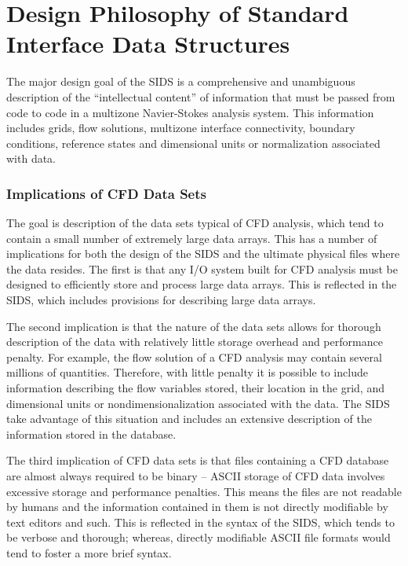 \section{Design Philosophy of Standard Interface Data Structures}
\label{s:design}
\thispagestyle{plain}

The major design goal of the SIDS is a comprehensive and unambiguous
description of the ``intellectual content'' of information that must be
passed from code to code in a multizone Navier-Stokes analysis system.
This information includes grids, flow solutions, multizone interface
connectivity, boundary conditions, reference states and dimensional
units or normalization associated with data.

\subsubsection*{Implications of CFD Data Sets}

The goal is description of the data sets typical of CFD analysis, which
tend to contain a small number of extremely large data arrays.  This
has a number of implications for both the design of the SIDS and the
ultimate physical files where the data resides.  The first is that any
I/O system built for CFD analysis must be designed to efficiently store
and process large data arrays.  This is reflected in the SIDS, which
includes provisions for describing large data arrays.

The second implication is that the nature of the data sets allows
for thorough description of the data with relatively little storage
overhead and performance penalty.  For example, the flow solution of a
CFD analysis may contain several millions of quantities.  Therefore,
with little penalty it is possible to include information describing
the flow variables stored, their location in the grid, and dimensional
units or nondimensionalization associated with the data.  The SIDS take
advantage of this situation and includes an extensive description of the
information stored in the database.

The third implication of CFD data sets is that files containing a CFD
database are almost always required to be binary -- ASCII storage of
CFD data involves excessive storage and performance penalties.  This
means the files are not readable by humans and the information contained
in them is not directly modifiable by text editors and such.  This is
reflected in the syntax of the SIDS, which tends to be verbose and
thorough; whereas, directly modifiable ASCII file formats would tend to
foster a more brief syntax.

